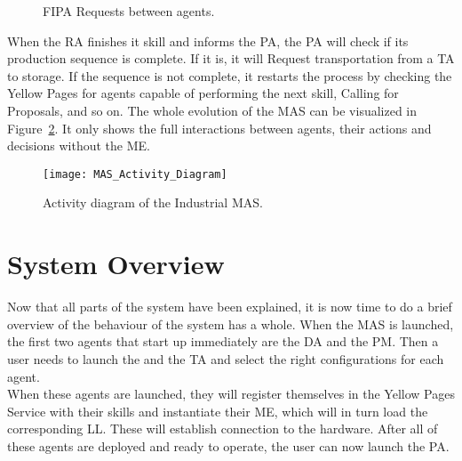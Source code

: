 \begin{figure}[h!]
	\centering
	\hspace{0.55cm}
	\caption{\acrshort{FIPA} Requests between agents.}
	\label{fig:agent_requests}
\end{figure}

When the \acrshort{RA} finishes it skill and informs the \acrshort{PA}, the \acrshort{PA} will check if its production sequence is complete. If it is, it will Request transportation from a \acrshort{TA} to storage. If the sequence is not complete, it restarts the process by checking the Yellow Pages for agents capable of performing the next skill, Calling for Proposals, and so on. The whole evolution of the \acrshort{MAS} can be visualized in Figure~\ref{fig:mas_activity_diagram}. It only shows the full interactions between agents, their actions and decisions without the \acrlong{ME}.\\

\begin{figure}[h!]
	\centering
	\texttt{[image: MAS\_Activity\_Diagram]}
	\caption{Activity diagram of the Industrial \acrlong{MAS}.}
	\label{fig:mas_activity_diagram}
\end{figure}

\section{System Overview}
\label{sec:system_overview}

Now that all parts of the system have been explained, it is now time to do a brief overview of the behaviour of the system has a whole. When the \acrshort{MAS} is launched, the first two agents that start up immediately are the \acrlong{DA} and the \acrlong{PM}. Then a user needs to launch the  and the \acrlong{TA} and select the right configurations for each agent.\\ 

When these agents are launched, they will register themselves in the Yellow Pages Service with their skills and instantiate their \acrlong{ME}, which will in turn load the corresponding \acrlong{LL}. These  will establish connection to the hardware. After all of these agents are deployed and ready to operate, the user can now launch the \acrlong{PA}.\\

